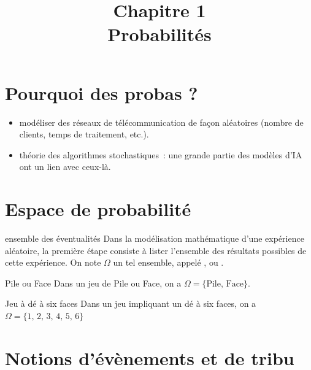 

\setcounter{chapitre}{1}

\title{\Large Chapitre 1 \\ \Huge Probabilités}



\maketitle

\newcommand{\tribu}[0]{\mathcal{T}}
\newcommand{\univ}[0]{\Omega}
\newcommand{\proba}[0]{\mathbb{P}}


\section*{Pourquoi des probas ?}
\begin{itemize}
    \item modéliser des réseaux de télécommunication de façon aléatoires (nombre de clients, temps de traitement, etc.).
    \item théorie des algorithmes stochastiques~: une grande partie des modèles d'IA ont un lien avec ceux-là.
\end{itemize}

\section{Espace de probabilité}

\begin{definition}{}{ensemble des éventualités}
    Dans la modélisation mathématique d'une expérience aléatoire, la première étape consiste à lister l'ensemble des résultats possibles de cette expérience. On note $\Omega$ un tel ensemble, appelé , ou .
\end{definition}

\begin{exemple}{}{Pile ou Face}
    Dans un jeu de Pile ou Face, on a $\Omega = \{\text{Pile},\, \text{Face}\}$.
\end{exemple}

\begin{exemple}{}{Jeu à dé à six faces}
    Dans un jeu impliquant un dé à six faces, on a $\Omega = \{1,\, 2,\, 3,\, 4,\, 5,\, 6\}$
    
\end{exemple}

\section{Notions d'évènements et de tribu}


